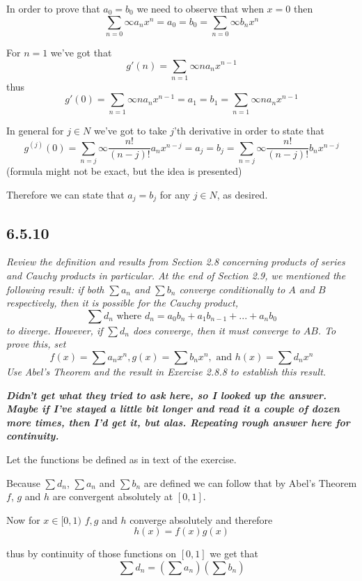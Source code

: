 \documentclass[11pt,oneside,titlepage]{book}
\begin{document}
In order to prove that $a_0 = b_0$ we need to observe that when $x = 0$
then
$$\sum_{n = 0}{\infty}{a_n x^n} = a_0 = b_0 = \sum_{n = 0}{\infty}{b_n x^n}$$

For $n = 1$ we've got that
$$g'(n) = \sum_{n = 1}{\infty}{n a_n x^{n - 1}}$$
thus
$$g'(0) = \sum_{n = 1}{\infty}{n a_n x^{n - 1}} = a_1 = b_1 =
\sum_{n = 1}{\infty}{n a_n x^{n - 1}}$$

In general for $j \in N$ we've got to take $j$'th derivative in
order to state that
$$g^{(j)}(0) = \sum_{n = j}{\infty}{\frac{n!}{(n - j)!} a_n x^{n - j}} = a_j
= b_j = \sum_{n = j}{\infty}{\frac{n!}{(n - j)!} b_n x^{n - j}}$$
(formula might not be exact, but the idea is presented)

Therefore we can state that $a_j = b_j$ for any $j \in N$, as desired.

\subsection*{6.5.10}
\textit{Review the definition and results from Section 2.8 concerning products
  of series and Cauchy products in particular. At the end of Section 2.9, we
  mentioned the following result: if both $\sum a_n$ and $\sum b_n$ converge
  conditionally to $A$ and $B$ respectively, then it is possible for the Cauchy
  product,}
$$\sum d_n \text{ where } d_n = a_0 b_n + a_1 b_{n - 1} + ... + a_n b_0$$
\textit{to diverge. However, if $\sum d_n$ does converge, then it must
  converge to $AB$. To prove this, set}
$$f(x) = \sum{ a_n x^n }, g(x) = \sum{b_n x^n}, \text{ and }
h(x)=\sum{d_n x^n}$$
\textit{Use Abel's Theorem and the result in Exercise 2.8.8 to establish this
  result.}

\textbf{\textit{Didn't get what they tried to ask here, so I looked up the
  answer. Maybe if I've stayed a little bit longer and read it a couple of
  dozen more times, then I'd get it, but alas. Repeating rough answer
  here for continuity.
}}

Let the functions be defined as in text of the exercise. 

Because $\sum d_n$, $\sum a_n$ and $\sum b_n$ are defined we can follow that
by Abel's Theorem $f$, $g$ and $h$ are convergent absolutely at $[0, 1]$.

Now for $x \in [0, 1)$ $f, g$ and $h$ converge absolutely and therefore
$$h(x) = f(x)g(x)$$

thus by continuity of those functions on $[0, 1]$ we get that
$$\sum d_n = (\sum a_n)(\sum b_n)$$
\end{document}
